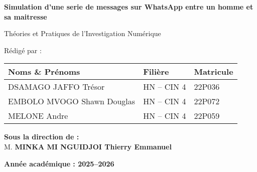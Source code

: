 \documentclass[12pt, a4paper]{article}
\begin{document}
\begin{titlepage}

	\vspace{1cm}

	{\LARGE \textbf{Simulation d'une serie de messages sur WhatsApp entre un homme et sa maitresse}}

	\vspace{0.5cm}

	{\LARGE {Théories et Pratiques de l'Investigation Numérique}}

	\vspace{2cm}

	{\large Rédigé par :}

	\vspace{0.5cm}

	\begin{tabular}{|>{\centering\arraybackslash}m{8cm}
		|>{\centering\arraybackslash}m{4cm}
		|>{\centering\arraybackslash}m{3cm}|}
		\hline
		\textbf{Noms \& Prénoms}   & \textbf{Filière} & \textbf{Matricule} \\
		\hline
		DSAMAGO JAFFO Trésor       & HN -- CIN 4      & 22P036             \\
		\hline
		EMBOLO MVOGO Shawn Douglas & HN -- CIN 4      & 22P072             \\
		\hline
		MELONE Andre               & HN -- CIN 4      & 22P059             \\
		\hline
	\end{tabular}

	\vfill

	\begin{Large}
		\textbf{Sous la direction de :} \\
		M. \textbf{MINKA MI NGUIDJOI Thierry Emmanuel} \\
	\end{Large}

	\vspace{0.5cm}

	\vspace{1cm}

	\textbf{Année académique : 2025--2026}
\end{titlepage}

\tableofcontents
\newpage

\end{document}
